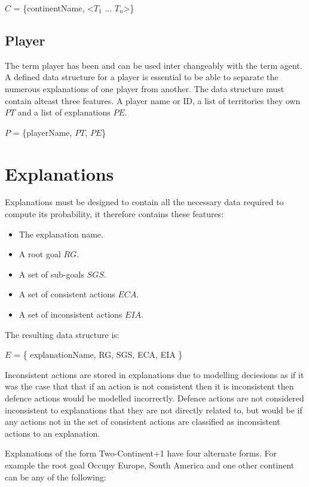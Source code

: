 \documentclass[parskip]{cs4rep}
\begin{document}
\centerline{
$C$ = \{continentName, <$T_{1}$ ... $T_{n}$>\}
}

\subsection{Player}

The term player has been and can be used inter changeably with the term agent. A defined data structure for a player is essential to be able to separate the numerous explanations of one player from another. The data structure must contain alteast three features. A player name or ID, a list of territories they own $PT$ and a list of explanations $PE$.\newline

\centerline{
$P$ = \{playerName, $PT$, $PE$\}
}

\section{Explanations}

Explanations must be designed to contain all the necessary data required to compute its probability, it therefore contains these features:

\begin{itemize}
\item
The explanation name.
\item
A root goal $RG$.
\item
A set of sub-goals $SGS$.
\item
A set of consistent actions $ECA$.
\item
A set of inconsistent actions $EIA$.
\end{itemize}

The resulting data structure is:\newline

\centerline{
$E$ = \{ explanationName, RG, SGS, ECA, EIA \}
}

Inconsistent actions are stored in explanations due to modelling deciesions as if it was the case that that if an action is not consistent then it is inconsistent then defence actions would be modelled incorrectly. Defence actions are not considered inconsistent to explanations that they are not directly related to, but would be if any actions not in the set of consistent actions are classified as inconsistent actions to an explanation.

Explanations of the form Two-Continent+1 have four alternate forms. For example the root goal Occupy Europe, South America and one other continent can be any of the following:
\end{document}
